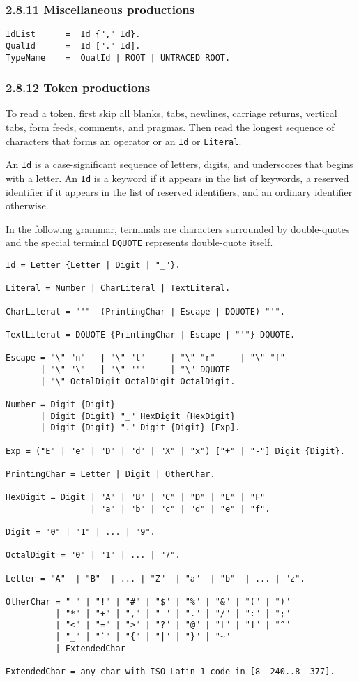 \documentclass[10pt]{article}
\begin{document}
\subsubsection*{2.8.11 Miscellaneous productions}

\begin{verbatim}
IdList      =  Id {"," Id}.
QualId      =  Id ["." Id].
TypeName    =  QualId | ROOT | UNTRACED ROOT.
\end{verbatim}

\subsubsection*{2.8.12 Token productions}

To read a token, first skip all blanks, tabs, newlines, carriage returns,
vertical tabs, form feeds, comments, and pragmas.  Then read the longest
sequence of characters that forms an operator or an \verb|Id| or
\verb|Literal|.

An \verb|Id| is a case-significant sequence of letters, digits, and
underscores that begins with a letter.  An \verb|Id| is a keyword if it
appears in the list of keywords, a reserved identifier if it appears in the
list of reserved identifiers, and an ordinary identifier otherwise.

In the following grammar, terminals are characters surrounded by double-quotes
and the special terminal \verb|DQUOTE| represents double-quote itself.

\begin{verbatim}
Id = Letter {Letter | Digit | "_"}.

Literal = Number | CharLiteral | TextLiteral.

CharLiteral = "'"  (PrintingChar | Escape | DQUOTE) "'".

TextLiteral = DQUOTE {PrintingChar | Escape | "'"} DQUOTE.

Escape = "\" "n"   | "\" "t"     | "\" "r"     | "\" "f"
       | "\" "\"   | "\" "'"     | "\" DQUOTE
       | "\" OctalDigit OctalDigit OctalDigit.

Number = Digit {Digit}
       | Digit {Digit} "_" HexDigit {HexDigit}
       | Digit {Digit} "." Digit {Digit} [Exp].

Exp = ("E" | "e" | "D" | "d" | "X" | "x") ["+" | "-"] Digit {Digit}.

PrintingChar = Letter | Digit | OtherChar.

HexDigit = Digit | "A" | "B" | "C" | "D" | "E" | "F"
                 | "a" | "b" | "c" | "d" | "e" | "f".

Digit = "0" | "1" | ... | "9".

OctalDigit = "0" | "1" | ... | "7".

Letter = "A"  | "B"  | ... | "Z"  | "a"  | "b"  | ... | "z".

OtherChar = " " | "!" | "#" | "$" | "%" | "&" | "(" | ")"
          | "*" | "+" | "," | "-" | "." | "/" | ":" | ";"
          | "<" | "=" | ">" | "?" | "@" | "[" | "]" | "^"
          | "_" | "`" | "{" | "|" | "}" | "~"
          | ExtendedChar

ExtendedChar = any char with ISO-Latin-1 code in [8_ 240..8_ 377].
\end{verbatim}
\end{document}
